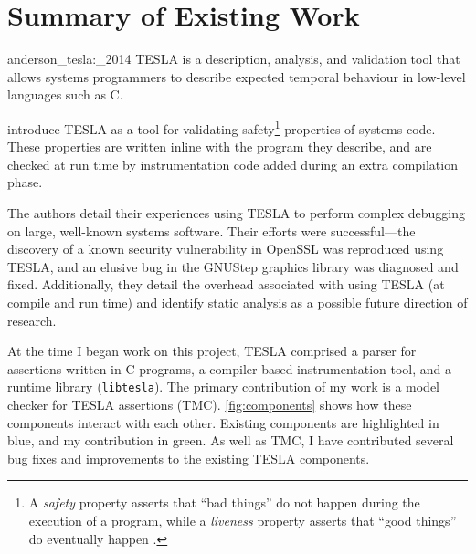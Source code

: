 \section{Summary of Existing Work}

\begin{displaycquote}[p.\ 1]{anderson_tesla:_2014}
TESLA is a description, analysis, and validation tool that allows systems
  programmers to describe expected temporal behaviour in low-level languages
  such as C.
\end{displaycquote}

\textcite{anderson_tesla:_2014} introduce TESLA as a tool for validating
safety\footnote{A \emph{safety} property asserts that ``bad things'' do not
happen during the execution of a program, while a \emph{liveness} property
asserts that ``good things'' do eventually happen
\cite{alpern_defining_1984,lamport_proving_1977}.} properties of systems code.
These properties are written inline with the program they describe, and
are checked at run time by instrumentation code added during an extra
compilation phase.

The authors detail their experiences using TESLA to perform complex debugging on
large, well-known systems software. Their efforts were successful---the
discovery of a known security vulnerability in OpenSSL was reproduced using
TESLA, and an elusive bug in the GNUStep graphics library was diagnosed and
fixed. Additionally, they detail the overhead associated with using TESLA (at
compile and run time) and identify static analysis as a possible future
direction of research.

At the time I began work on this project, TESLA comprised a parser for
assertions written in C programs, a compiler-based instrumentation tool, and a
runtime library (\texttt{libtesla}). The primary contribution of my work
is a model checker for TESLA assertions (TMC). \autoref{fig:components} shows
how these components interact with each other. Existing components are
highlighted in blue, and my contribution in green. As well as TMC, I have
contributed several bug fixes and improvements to the existing TESLA components. 

